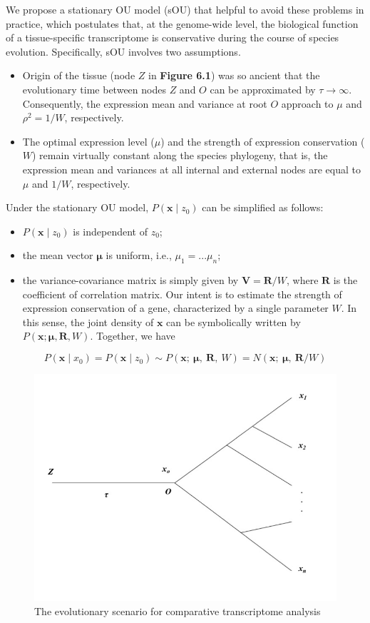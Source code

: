 \documentclass[]{book}
\providecommand{\tightlist}{%
  \setlength{\itemsep}{0pt}\setlength{\parskip}{0pt}}
\begin{document}
We propose a stationary OU model (sOU) that helpful to avoid these problems in practice, which postulates that, at the genome-wide level, the biological function of a tissue-specific transcriptome is conservative during the course of species evolution. Specifically, sOU involves two assumptions.

\begin{itemize}
\tightlist
\item
  Origin of the tissue (node \(Z\) in \textbf{Figure 6.1}) was so ancient that the evolutionary time between nodes \(Z\) and \(O\) can be approximated by \(\tau \to \infty\). Consequently, the expression mean and variance at root \(O\) approach to \(\mu\) and \(\rho^{2} = 1/W\), respectively.
\item
  The optimal expression level (\(\mu\)) and the strength of expression conservation (\(W\)) remain virtually constant along the species phylogeny, that is, the expression mean and variances at all internal and external nodes are equal to \(\mu\) and \(1/W\), respectively.
\end{itemize}

Under the stationary OU model, \(P\left(\boldsymbol{x}\mid z_0\right)\) can be simplified as follows:

\begin{itemize}
\tightlist
\item
  \(P\left(\boldsymbol{x}\mid z_0\right)\) is independent of \(z_0\);
\item
  the mean vector \(\boldsymbol{\mu}\) is uniform, i.e., \(\mu_1=...\mu_n\);
\item
  the variance-covariance matrix is simply given by \(\boldsymbol{V}=\boldsymbol{R}/W\), where \(\boldsymbol{R}\) is the coefficient of correlation matrix. Our intent is to estimate the strength of expression conservation of a gene, characterized by a single parameter \(W\). In this sense, the joint density of \(\boldsymbol{x}\) can be symbolically written by \(P\left(\boldsymbol{x};\boldsymbol{\mu},\boldsymbol{R},W\right)\). Together, we have
\end{itemize}

\[P\left(\boldsymbol{x}\mid x_0\right)=P\left(\boldsymbol{x}\mid z_0\right)\sim P\left(\boldsymbol{x};\  \boldsymbol{\mu},\  \boldsymbol{R},\  W\right)=N\left(\boldsymbol{x};\  \boldsymbol{\mu},\  \boldsymbol{R}/W\right)\tag{3.3}\]

\begin{figure}
\includegraphics[width=0.5\linewidth]{Figure2} \caption{The evolutionary scenario for comparative transcriptome analysis}\label{fig:pressure}
\end{figure}
\end{document}
